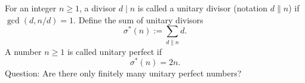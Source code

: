 For an integer $n\ge 1$, a divisor $d\mid n$ is called a unitary divisor (notation $d\parallel n$)
if $\gcd(d,n/d)=1$.
Define the sum of unitary divisors
\[
  \sigma^*(n):=\sum_{d\parallel n} d.
\]
A number $n\ge 1$ is called unitary perfect if
\[
  \sigma^*(n)=2n.
\]
Question: Are there only finitely many unitary perfect numbers?
